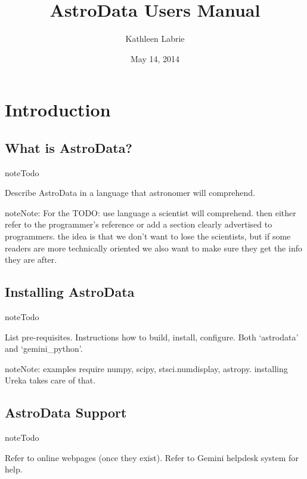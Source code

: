 \documentclass[letterpaper,10pt,english]{sphinxmanual}
\title{AstroData Users Manual}
\date{May 14, 2014}
\author{Kathleen Labrie}
\begin{document}
\maketitle
\tableofcontents
{}\label{index-latex::doc}



\chapter{Introduction}
\label{intro:introduction}\label{intro::doc}\label{intro:astrodata-user-s-manual}

\section{What is AstroData?}
\label{intro:what-is-astrodata}
\begin{notice}{note}{Todo}

Describe AstroData in a language that astronomer will comprehend.
\end{notice}

\begin{notice}{note}{Note:}
For the TODO: use language a scientist will comprehend.  then either refer to the programmer's reference
or add a section clearly advertised to programmers.  the idea is that we don't want to lose
the scientists, but if some readers are more technically oriented we also want to make sure
they get the info they are after.
\end{notice}


\section{Installing AstroData}
\label{intro:installing-astrodata}
\begin{notice}{note}{Todo}

List pre-requisites. Instructions how to build, install, configure. Both `astrodata' and `gemini\_python'.
\end{notice}

\begin{notice}{note}{Note:}
examples require numpy, scipy, stsci.numdisplay, astropy.  installing Ureka takes care of that.
\end{notice}


\section{AstroData Support}
\label{intro:astrodata-support}
\begin{notice}{note}{Todo}

Refer to online webpages (once they exist).  Refer to Gemini helpdesk system for help.
\end{notice}
\end{document}
